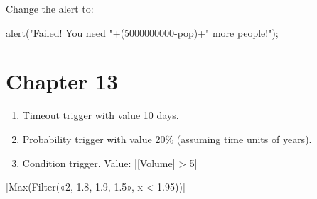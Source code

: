 \documentclass[]{memoir}
\newenvironment{Shaded}{}{}
\newcommand{\DecValTok}[1]{\textcolor[rgb]{0.25,0.63,0.44}{{#1}}}
\newcommand{\FloatTok}[1]{\textcolor[rgb]{0.25,0.63,0.44}{{#1}}}
\newcommand{\StringTok}[1]{\textcolor[rgb]{0.25,0.44,0.63}{{#1}}}
\newcommand{\FunctionTok}[1]{\textcolor[rgb]{0.02,0.16,0.49}{{#1}}}
\newcommand{\NormalTok}[1]{{#1}}
\begin{document}

Change the alert to:

\begin{Shaded}
\begin{Highlighting}[]
\FunctionTok{alert}\NormalTok{(}\StringTok{"Failed! You need "}\NormalTok{+(}\DecValTok{5000000000}\NormalTok{-pop)+}\StringTok{" more people!"}\NormalTok{);}
\end{Highlighting}
\end{Shaded}

\section{Chapter 13}


\begin{enumerate}
\def\labelenumi{\arabic{enumi}.}
\itemsep1pt\parskip0pt
\item
  Timeout trigger with value 10 days.
\item
  Probability trigger with value 20\% (assuming time units of years).
\item
  Condition trigger. Value: |\NormalTok{[Volume] > }\DecValTok{5}|
\end{enumerate}


|\FunctionTok{Max}\NormalTok{(}\FunctionTok{Filter}\NormalTok{(«2, }\FloatTok{1.8}\NormalTok{, }\FloatTok{1.9}\NormalTok{, }\FloatTok{1.5}\NormalTok{», x < }\FloatTok{1.95}\NormalTok{))}|

\end{document}
